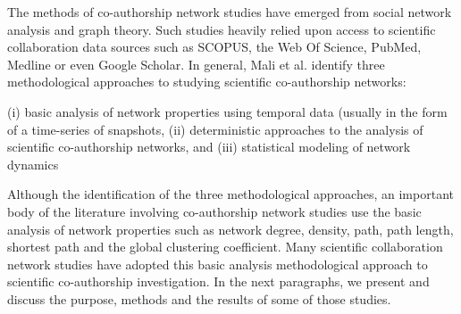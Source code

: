 The methods of co-authorship network studies have emerged from social network analysis and graph theory. Such studies heavily relied upon access to scientific collaboration data sources such as SCOPUS, the Web Of Science, PubMed, Medline or even Google Scholar. In general, Mali et al. \cite{mali_dynamic_2012} identify three methodological approaches to studying scientific co-authorship networks:%
\begin{displayquote}
(i) basic analysis of network properties using temporal data (usually in the form of a time-series of snapshots, (ii) deterministic approaches to the analysis of scientific co-authorship networks, and (iii) statistical modeling of network dynamics
\end{displayquote}
Although the identification of the three methodological approaches, an important body of the literature involving co-authorship network studies use the basic analysis of network properties such as network degree, density, path, path length, shortest path and the global clustering coefficient. Many scientific collaboration network studies have adopted this basic analysis methodological approach to scientific co-authorship investigation. In the next paragraphs, we present and discuss the purpose, methods and the results of some of those studies.\\

